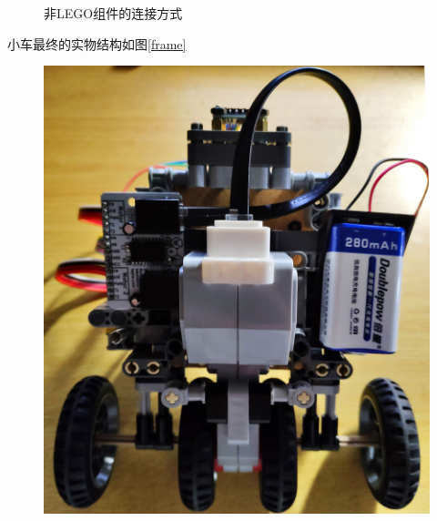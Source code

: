 \documentclass[a4paper]{ctexart}
\begin{document}
\begin{spacing}{1.5}
\begin{enumerate}
\begin{figure}[htbp]
\begin{minipage}[t]{0.495\textwidth}
		\end{minipage}
		\caption{非LEGO组件的连接方式}\label{link}
	\end{figure}
\end{enumerate}
小车最终的实物结构如图\ref{frame}
\begin{figure}[htbp]
\begin{minipage}[t]{0.476\textwidth}
	\centering
	\includegraphics[width=\textwidth]{figure//F1.jpg}
\end{minipage}%
\hfill
\begin{minipage}[t]{0.524\textwidth}
	\centering

\end{minipage}
\end{figure}
\end{spacing}
\end{document}
